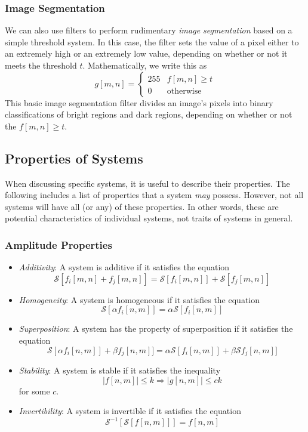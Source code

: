 \documentclass{article}
\begin{document}
\subsubsection*{Image Segmentation}
We can also use filters to perform rudimentary \emph{image segmentation} based on a simple threshold system. In this case, the filter sets the value of a pixel either to an extremely high or an extremely low value, depending on whether or not it meets the threshold $t$. Mathematically, we write this as
\[
	g[m, n] = \begin{cases} 255 & f[m, n] \geq t \\ 0 & \text{otherwise}\end{cases} \tag{Threshold}
\]
This basic image segmentation filter divides an image's pixels into binary classifications of bright regions and dark regions, depending on whether or not the $f[m, n] \geq t$.

\subsection{Properties of Systems}

When discussing specific systems, it is useful to describe their properties. The following includes a list of properties that a system \emph{may} possess. However, not all systems will have all (or any) of these properties. In other words, these are potential characteristics of individual systems, not traits of systems in general.

\subsubsection*{Amplitude Properties}

\begin{itemize}
	\item \emph{Additivity}: A system is additive if it satisfies the equation
    \[
    	\mathcal{S}[f_i[m, n] + f_j[m, n]] = \mathcal{S}[f_i[m, n]] + \mathcal{S}[f_j[m, n]]
    \]

    \item  \emph{Homogeneity}: A system is homogeneous if it satisfies the equation
    \[
		\mathcal{S}[\alpha f_i[n, m]] = \alpha\mathcal{S}[f_i[n, m]]
    \]
	
    \item \emph{Superposition}: A system has the property of superposition if it satisfies the equation
    \[
    	\mathcal{S}[\alpha f_i[n, m]] + \beta f_j[n, m]] = \alpha\mathcal{S}[f_i[n, m]] + \beta\mathcal{S}f_j[n, m]]
    \]

	\item \emph{Stability}: A system is stable if it satisfies the inequality
    \[
    	\left\vert f[n, m] \right\vert \leq k \Longrightarrow \left\vert	g[n, m] \right\vert \leq ck
    \]
    for some $c$.
	
    \item \emph{Invertibility}: A system is invertible if it satisfies the equation
    \[
    	\mathcal{S}^{-1}[\mathcal{S}[f[n, m]]] = f[n, m]
    \]
\end{itemize}
\end{document}
